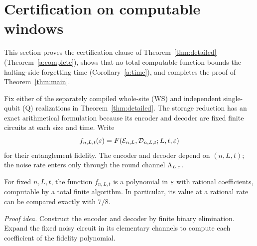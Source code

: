\section{Certification on computable windows}\label{a:certification}

This section proves the certification clause of Theorem~\ref{thm:detailed} (Theorem~\ref{a:complete}), shows that no total computable function bounds the halting-side forgetting time (Corollary~\ref{a:time}), and completes the proof of Theorem~\ref{thm:main}.


Fix either of the separately compiled whole-site (\(\mathrm{WS}\)) and independent single-qubit (\(\mathrm Q\))
realizations in Theorem~\ref{thm:detailed}. The storage reduction has an
exact arithmetical formulation because its encoder and decoder are fixed finite circuits at each size and time.
Write
\[
 f_{n,L,t}(\varepsilon)=
 F(\mathcal E_{n,L},\mathcal D_{n,L,t};L,t,\varepsilon)
\]
for their entanglement fidelity. The encoder and decoder depend on \((n,L,t)\); the noise rate enters only
through the round channel \(\Lambda_{L,\varepsilon}\).

\begin{proposition}\label{a:rational}
For fixed \(n,L,t\), the function \(f_{n,L,t}\) is a polynomial in \(\varepsilon\)
with rational coefficients, computable by a total finite algorithm.
In particular, its value at a rational rate can be compared exactly with
\(7/8\).
\end{proposition}
\par\noindent\emph{Proof idea.} Construct the encoder and decoder by finite binary elimination. Expand the fixed noisy circuit in its elementary channels to compute each coefficient of the fidelity polynomial.

